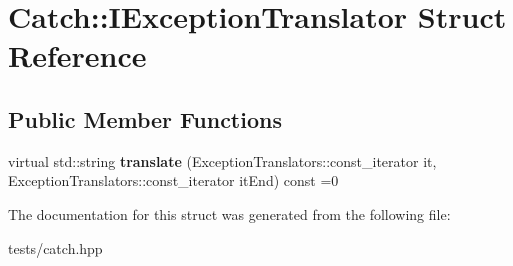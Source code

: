 \hypertarget{struct_catch_1_1_i_exception_translator}{}\section{Catch\+:\+:I\+Exception\+Translator Struct Reference}
\label{struct_catch_1_1_i_exception_translator}
\subsection*{Public Member Functions}
\begin{DoxyCompactItemize}
\item 
\mbox{\label{struct_catch_1_1_i_exception_translator_a2a554b96ed5ed411e7c796b6b42837a5}} 
virtual std\+::string {\bfseries translate} (Exception\+Translators\+::const\+\_\+iterator it, Exception\+Translators\+::const\+\_\+iterator it\+End) const =0
\end{DoxyCompactItemize}


The documentation for this struct was generated from the following file\+:\begin{DoxyCompactItemize}
\item 
tests/catch.\+hpp\end{DoxyCompactItemize}
